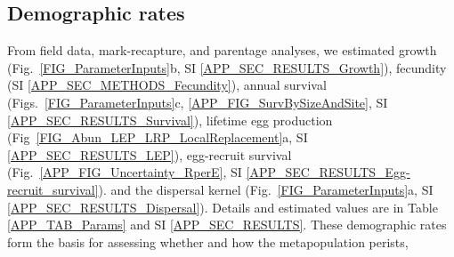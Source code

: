 \documentclass[12pt, oneside]{article}   	%
\begin{document}
\subsection*{Demographic rates}


From field data, mark-recapture, and parentage analyses, we estimated growth (Fig.\ \ref{FIG_ParameterInputs}b, SI \ref{APP_SEC_RESULTS_Growth}), fecundity (SI \ref{APP_SEC_METHODS_Fecundity}), annual survival (Figs.\ \ref{FIG_ParameterInputs}c, \ref{APP_FIG_SurvBySizeAndSite}, SI \ref{APP_SEC_RESULTS_Survival}), lifetime egg production (Fig\ \ref{FIG_Abun_LEP_LRP_LocalReplacement}a, SI \ref{APP_SEC_RESULTS_LEP}), egg-recruit survival (Fig.\ \ref{APP_FIG_Uncertainty_RperE}, SI \ref{APP_SEC_RESULTS_Egg-recruit_survival}). \cite{catalanoInPrepconnectivity} and the dispersal kernel (Fig.\ \ref{FIG_ParameterInputs}a, SI \ref{APP_SEC_RESULTS_Dispersal}). Details and estimated values are in Table \ref{APP_TAB_Params} and SI \ref{APP_SEC_RESULTS}. These demographic rates form the basis for assessing whether and how the metapopulation perists,

\end{document}
